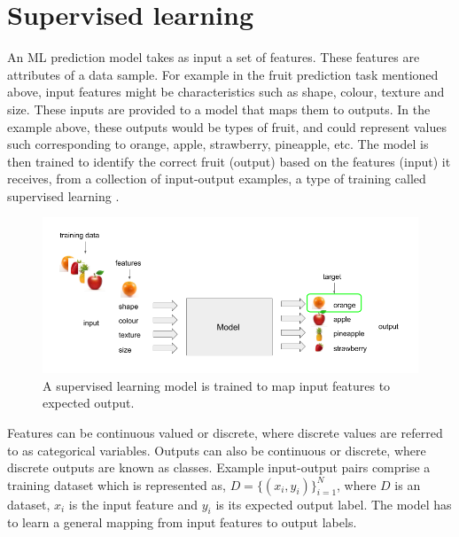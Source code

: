 
\section{Supervised learning}

An ML prediction model takes as input a set of features. These features are attributes of a data sample. For example in the fruit prediction task mentioned above, input features might be characteristics such as shape, colour, texture and size. These inputs are provided to a model that maps them to outputs. In the example above, these outputs would be types of fruit, and could represent values such corresponding to orange, apple, strawberry, pineapple, etc. The model is then trained to identify the correct fruit (output) based on the features (input) it receives, from a collection of input-output examples, a type of training called supervised learning \citep{bishop2006pattern, hastie2009elements, murphy2012machine}.

\begin{figure}[H]
   	\centering
    	\includegraphics[width=\textwidth]{supervised_learning}
	\caption{A supervised learning model is trained to map input features to expected output.}
\end{figure}

\noindent Features can be continuous valued or discrete, where discrete values are referred to as categorical variables. Outputs can also be continuous or discrete, where discrete outputs are known as classes. Example input-output pairs comprise a training dataset which is represented as, \begin{math} D = \{(x_i, y_i)\}_{i=1}^N \end{math}, where \begin{math} D \end{math} is an dataset, \begin{math} x_i \end{math} is the input feature and \begin{math} y_i \end{math} is its expected output label. The model has to learn a general mapping from input features to output labels. \par

